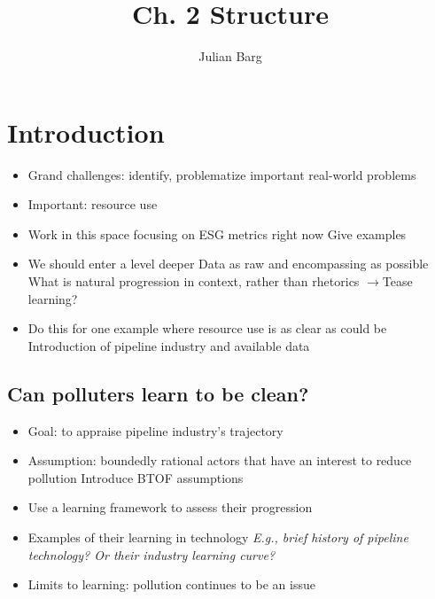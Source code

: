 \documentclass{article}
\title{Ch. 2 Structure}
\author{Julian Barg}
\begin{document}
	\maketitle
	
	\section{Introduction}	
	\begin{itemize}
		\item Grand challenges: identify, problematize important real-world problems \citep{George2016}
		\item Important: resource use \citep{George2015}
		\item Work in this space focusing on ESG metrics right now
			\subitem Give examples
		\item We should enter a level deeper
			\subitem Data as raw and encompassing as possible
			\subitem What is natural progression in context, rather than rhetorics
				\subsubitem $\rightarrow$Tease learning?
		\item Do this for one example where resource use is as clear as could be
			\subitem Introduction of pipeline industry and available data
	\end{itemize}

	\subsection{Can polluters learn to be clean?}
	\begin{itemize}
		\item Goal: to appraise pipeline industry's trajectory
		\item Assumption: boundedly rational actors that have an interest to reduce pollution
			\subitem Introduce BTOF assumptions
		\item Use a learning framework to assess their progression
		\item Examples of their learning in technology
			\textit{\subitem E.g., brief history of pipeline technology?
			\subitem Or their industry learning curve?}
		\item Limits to learning: pollution continues to be an issue
	\end{itemize}
\end{document}
